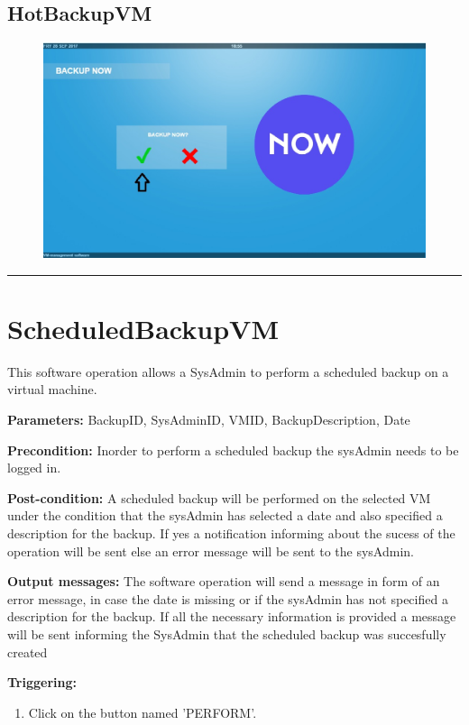  
\subsection{HotBackupVM}

\begin{figure}[H]
\centering
\includegraphics[width=170mm]{images/hotback4.eps}
\caption{\label{overflow}}
\end{figure}


\hrule
\vspace{0.5cm}





\section{ScheduledBackupVM}
\label{operation:ScheduledBackupVM}
This software operation allows a SysAdmin to perform a scheduled backup on a
virtual machine.
\begin{description}

\item \textbf{Parameters:} BackupID, SysAdminID, VMID, BackupDescription, Date
\item \textbf{Precondition:} Inorder to perform a scheduled backup the sysAdmin 
needs to be logged in.
\item \textbf{Post-condition:} A scheduled backup will be performed on the
selected VM under the condition that the sysAdmin has selected a date and
also specified a description for the backup. If yes a notification informing
about the sucess of the operation will be sent else an error message will be
sent to the sysAdmin.
\item \textbf{Output messages:} The software operation will send a message in
form of an error message, in case the date is missing or if the sysAdmin has 
not specified a description for the backup. If all the necessary information
is provided a message will be sent informing the SysAdmin that the scheduled 
backup was succesfully created


\item \textbf{Triggering:}
\begin{enumerate}
\item Click on the button named 'PERFORM'.
\end{enumerate}

 
\end{description}


